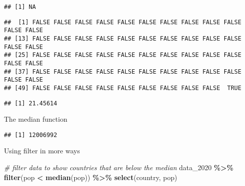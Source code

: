 \documentclass[
]{article}
\newenvironment{Shaded}{\begin{snugshade}}{\end{snugshade}}
\newcommand{\AttributeTok}[1]{\textcolor[rgb]{0.13,0.29,0.53}{#1}}
\newcommand{\CommentTok}[1]{\textcolor[rgb]{0.56,0.35,0.01}{\textit{#1}}}
\newcommand{\ConstantTok}[1]{\textcolor[rgb]{0.56,0.35,0.01}{#1}}
\newcommand{\FunctionTok}[1]{\textcolor[rgb]{0.13,0.29,0.53}{\textbf{#1}}}
\newcommand{\NormalTok}[1]{#1}
\newcommand{\SpecialCharTok}[1]{\textcolor[rgb]{0.81,0.36,0.00}{\textbf{#1}}}
\begin{document}
\begin{verbatim}
## [1] NA
\end{verbatim}

\begin{Shaded}
\end{Shaded}

\begin{verbatim}
##  [1] FALSE FALSE FALSE FALSE FALSE FALSE FALSE FALSE FALSE FALSE FALSE FALSE
## [13] FALSE FALSE FALSE FALSE FALSE FALSE FALSE FALSE FALSE FALSE FALSE FALSE
## [25] FALSE FALSE FALSE FALSE FALSE FALSE FALSE FALSE FALSE FALSE FALSE FALSE
## [37] FALSE FALSE FALSE FALSE FALSE FALSE FALSE FALSE FALSE FALSE FALSE FALSE
## [49] FALSE FALSE FALSE FALSE FALSE FALSE FALSE FALSE FALSE  TRUE
\end{verbatim}

\begin{Shaded}
\end{Shaded}

\begin{verbatim}
## [1] 21.45614
\end{verbatim}

The median function

\begin{Shaded}
\end{Shaded}

\begin{verbatim}
## [1] 12006992
\end{verbatim}

Using filter in more ways

\begin{Shaded}
\begin{Highlighting}[]
\CommentTok{\# filter data to show countries that are below the median}
\NormalTok{data\_2020 }\SpecialCharTok{\%\textgreater{}\%} 
  \FunctionTok{filter}\NormalTok{(pop }\SpecialCharTok{\textless{}} \FunctionTok{median}\NormalTok{(pop)) }\SpecialCharTok{\%\textgreater{}\%} 
  \FunctionTok{select}\NormalTok{(country, pop)}
\end{Highlighting}
\end{Shaded}
\end{document}
